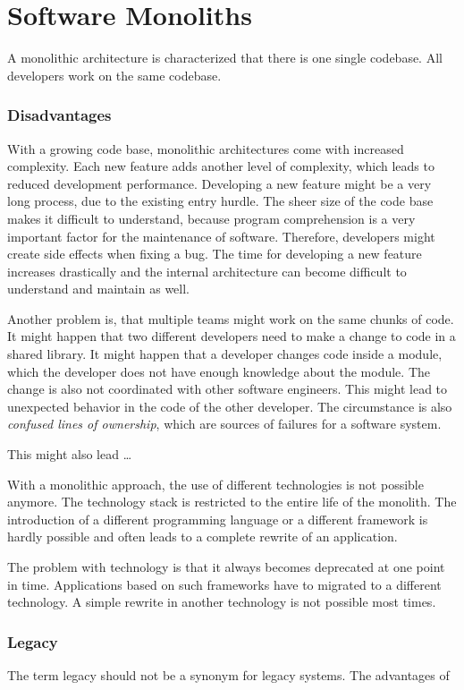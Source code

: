 \section{Software Monoliths}

A monolithic architecture is characterized that there is one single codebase. All developers work on the same codebase.

\subsubsection{Disadvantages}

With a growing code base, monolithic architectures come with increased complexity. Each new feature adds another level of complexity, which leads to reduced development performance. Developing a new feature might be a very long process, due to the existing entry hurdle. The sheer size of the code base makes it difficult to understand, because program comprehension is a very important factor for the maintenance of software. Therefore, developers might create side effects when fixing a bug. The time for developing a new feature increases drastically and the internal architecture can become difficult to understand and maintain as well.

Another problem is, that multiple teams might work on the same chunks of code. It might happen that two different developers need to make a change to code in a shared library. It might happen that a developer changes code inside a module, which the developer does not have enough knowledge about the module. The change is also not coordinated with other software engineers. This might lead to unexpected behavior in the code of the other developer. The circumstance is also \textit{confused lines of ownership}, which are sources of failures for a software system.

This might also lead \dots

With a monolithic approach, the use of different technologies is not possible anymore. The technology stack is restricted to the entire life of the monolith. The introduction of a different programming language or a different framework is hardly possible and often leads to a complete rewrite of an application. \cite{book:2018:richardson:background:bff:microservices-patterns}

The problem with technology is that it always becomes deprecated at one point in time. Applications based on such frameworks have to migrated to a different technology. A simple rewrite in another technology is not possible most times.

\subsubsection{Legacy}

The term legacy should not be a synonym for legacy systems. The advantages of 